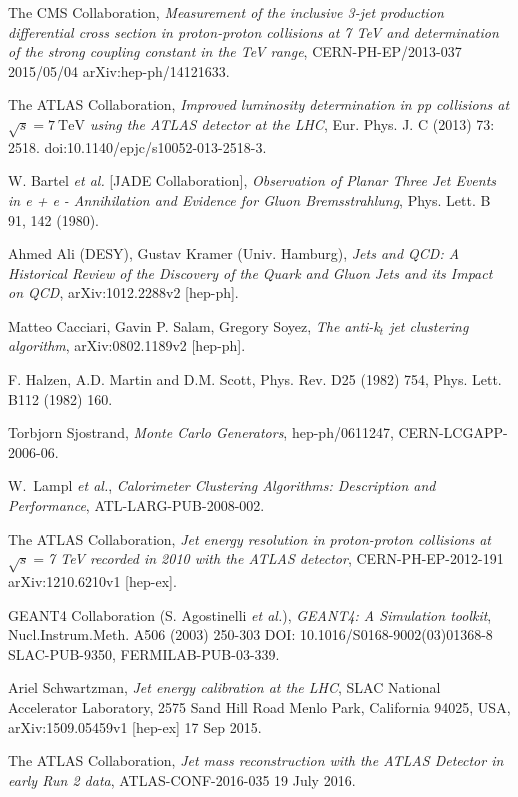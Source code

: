 \documentclass[UKenglish,texlive=2013]{\ATLASLATEXPATH atlasdoc}
\begin{document}
\begin{thebibliography}{9}
The CMS Collaboration,
\emph{Measurement of the inclusive 3-jet production differential
cross section in proton-proton collisions at 7 TeV and
determination of the strong coupling constant in the TeV
range},
CERN-PH-EP/2013-037
2015/05/04
arXiv:hep-ph/14121633.

The ATLAS Collaboration,
\emph{Improved luminosity determination in pp collisions at $\sqrt {s} = 7\ \mathrm{TeV}$ using the ATLAS detector at the LHC},
Eur. Phys. J. C (2013) 73: 2518. doi:10.1140/epjc/s10052-013-2518-3.

W. Bartel \emph{et al.} [JADE Collaboration],
\emph{Observation of Planar Three Jet Events in e + e -
Annihilation and Evidence for Gluon Bremsstrahlung},
Phys. Lett. B 91, 142 (1980).

Ahmed Ali (DESY), Gustav Kramer (Univ. Hamburg),
\emph{Jets and QCD: A Historical Review of the Discovery of the Quark and Gluon Jets and its Impact on QCD},
arXiv:1012.2288v2 [hep-ph].

Matteo Cacciari, Gavin P. Salam, Gregory Soyez,
\emph{The anti-k$_t$ jet clustering algorithm},
arXiv:0802.1189v2 [hep-ph]. 

F. Halzen, A.D. Martin and D.M. Scott,  
Phys. Rev. D25 (1982) 754,
Phys. Lett. B112 (1982) 160.

Torbjorn Sjostrand,
\emph{Monte Carlo Generators},
hep-ph/0611247,
CERN-LCGAPP-2006-06.

W.~Lampl \emph{et al.},
\emph{Calorimeter Clustering Algorithms: Description and Performance},
ATL-LARG-PUB-2008-002.

The ATLAS Collaboration,
\emph{Jet energy resolution in proton-proton collisions at $\sqrt{s}=$7 TeV recorded in 2010 with the ATLAS detector},
CERN-PH-EP-2012-191
arXiv:1210.6210v1  [hep-ex].

GEANT4 Collaboration (S. Agostinelli \emph{et al.}), 
\emph{GEANT4: A Simulation toolkit},
Nucl.Instrum.Meth. A506 (2003) 250-303
DOI: 10.1016/S0168-9002(03)01368-8
SLAC-PUB-9350, FERMILAB-PUB-03-339.

Ariel Schwartzman,
\emph{Jet energy calibration at the LHC},
SLAC National Accelerator Laboratory, 2575 Sand Hill Road
Menlo Park, California 94025, USA,
arXiv:1509.05459v1 [hep-ex] 17 Sep 2015.

The ATLAS Collaboration,
\emph{Jet mass reconstruction with the ATLAS Detector in early Run 2 data},
ATLAS-CONF-2016-035
19 July 2016.


\end{thebibliography}
\end{document}
